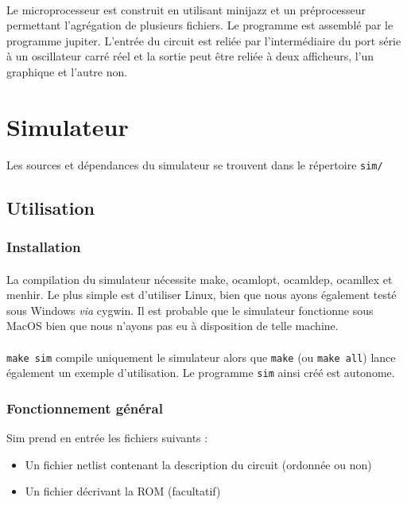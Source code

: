 \documentclass{article}
\begin{document}
\paragraph{}Le microprocesseur est construit en utilisant minijazz et un préprocesseur permettant l'agrégation de plusieurs fichiers. Le programme est assemblé par le programme jupiter. L'entrée du circuit est reliée par l'intermédiaire du port série à un oscillateur carré réel et la sortie peut être reliée à deux afficheurs, l'un graphique et l'autre non.

\section{Simulateur}

Les sources et dépendances du simulateur se trouvent dans le répertoire \texttt{sim/}


\subsection{Utilisation}
\subsubsection{Installation}
\paragraph{}La compilation du simulateur nécessite make, ocamlopt, ocamldep, ocamllex et menhir. Le plus simple est d'utiliser Linux, bien que nous ayons également testé sous Windows \emph{via} cygwin. Il est probable que le simulateur fonctionne sous MacOS bien que nous n'ayons pas eu à disposition de telle machine.

\paragraph{}\texttt{make sim} compile uniquement le simulateur alors que \texttt{make} (ou \texttt{make all}) lance également un exemple d'utilisation. Le programme \texttt{sim} ainsi créé est autonome.

\subsubsection{Fonctionnement général}
Sim prend en entrée les fichiers suivants :
\begin{itemize}
	\item Un fichier netlist contenant la description du circuit (ordonnée ou non)
	\item Un fichier décrivant la ROM (facultatif)
\end{itemize}
\end{document}

